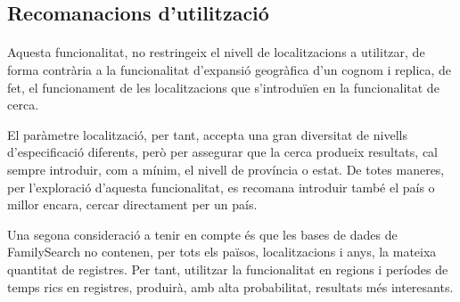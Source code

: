 \subsection{Recomanacions d'utilització}

    \paragraph{}
    Aquesta funcionalitat, no restringeix el nivell de localitzacions a utilitzar, de forma contrària a la funcionalitat d'expansió geogràfica d'un cognom i replica, de fet, el funcionament de les localitzacions  que s’introduïen en la funcionalitat de cerca.

    El paràmetre localització, per tant, accepta una gran diversitat de nivells d'especificació diferents, però per assegurar que la cerca produeix resultats, cal sempre introduir, com a mínim, el nivell de província o estat. De totes maneres, per l'exploració d'aquesta funcionalitat, es recomana introduir també el país o millor encara, cercar directament per un país.

    Una segona consideració a tenir en compte és que les bases de dades de FamilySearch no contenen, per tots els països, localitzacions i anys, la mateixa quantitat de registres. Per tant, utilitzar la funcionalitat en regions i períodes de temps rics en registres, produirà, amb alta probabilitat, resultats més interesants.
